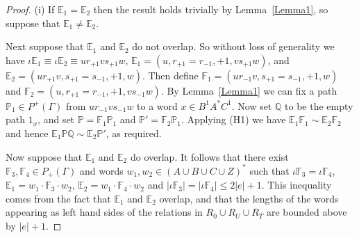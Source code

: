 \documentclass[11pt]{amsart}
\theoremstyle{plain}
\begin{document}
\begin{proof}
(i) If ${\mathbb{E}}_1 = {\mathbb{E}}_2$ then the result holds trivially by Lemma~\ref{Lemma1}, so suppose that ${\mathbb{E}}_1 \neq {\mathbb{E}}_2$.
\begin{sloppypar}
Next suppose that ${\mathbb{E}}_1$ and ${\mathbb{E}}_2$ do not overlap. So without loss of generality we have $\iota {\mathbb{E}}_1 \equiv \iota {\mathbb{E}}_2 \equiv u r_{+1} v s_{+1} w$, ${\mathbb{E}}_1 = (u, r_{+1} = r_{-1}, +1, vs_{+1} w)$, and ${\mathbb{E}}_2 = (ur_{+1} v, s_{+1} = s_{-1}, +1, w)$. Then define ${\mathbb{F}}_1 = (ur_{-1} v, s_{+1} = s_{-1}, +1, w)$ and ${\mathbb{F}}_2 = (u, r_{+1} = r_{-1}, +1, vs_{-1} w)$. By Lemma~\ref{Lemma1} we can fix a path ${\mathbb{P}}_1 \in P^+(\Gamma)$ from $u r_{-1} v s_{-1} w$ to a word $x \in B^1 A^* C^1$. Now set ${\mathbb{Q}}$ to be the empty path $1_x$, and set ${\mathbb{P}} = {\mathbb{F}}_1 {\mathbb{P}}_1$ and ${\mathbb{P}}' = {\mathbb{F}}_2 {\mathbb{P}}_1$. Applying (H1) we have ${\mathbb{E}}_1 {\mathbb{F}}_1 \sim {\mathbb{E}}_2 {\mathbb{F}}_2$ and hence ${\mathbb{E}}_1 {\mathbb{P}} {\mathbb{Q}} \sim {\mathbb{E}}_2 {\mathbb{P}}'$, as  required.  
\end{sloppypar}
Now suppose that ${\mathbb{E}}_1$ and ${\mathbb{E}}_2$ do overlap. It follows that there exist ${\mathbb{F}}_3, {\mathbb{F}}_4 \in P_+(\Gamma)$ and words $w_1, w_2 \in (A \cup B \cup C \cup Z)^*$ such that $\iota {\mathbb{F}}_3 = \iota {\mathbb{F}}_4$, ${\mathbb{E}}_1 = w_1 \cdot {\mathbb{F}}_3 \cdot w_2$, ${\mathbb{E}}_2 = w_1 \cdot {\mathbb{F}}_4 \cdot w_2$ and $|\iota {\mathbb{F}}_3 | = |\iota {\mathbb{F}}_4| \leq 2 |e| + 1$. This inequality comes from the fact that ${\mathbb{E}}_1$ and ${\mathbb{E}}_2$ overlap, and that the lengths of the words appearing as left hand sides of the relations in $R_0 \cup R_U \cup R_T$ are bounded above by $|e| + 1$. 


\end{proof}
\end{document}
